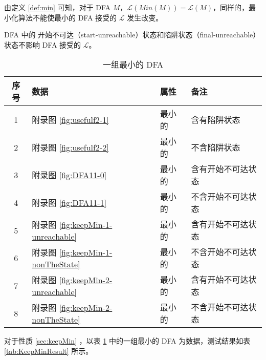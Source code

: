 \begin{property}\label{sec:keepMin}
    由定义 \ref{def:min} 可知，对于 DFA $M$，$\mathcal{L}(Min(M))= \mathcal{L}(M)$，同样的，最小化算法不能使最小的 DFA 接受的 $\mathcal{L}$ 发生改变。
\end{property}

\begin{remark}
    DFA 中的 开始不可达（start-unreachable）状态和陷阱状态（final-unreachable）状态不影响 DFA 接受的 $\mathcal{L}$。
\end{remark}



\begin{table}[!htbp]
    \caption{一组最小的 DFA}
    \label{tab:KeepMinData}
    \centering
    \small%
    \setlength{\tabcolsep}{4pt}%
    \renewcommand{\arraystretch}{1.2}%
    \begin{tabular}{c p{7em}<{\centering} p{4em}<{\centering} l}  %
        \toprule %
                序号  &  数据 & 属性 & 备注 \\
        \midrule%
        1 &  附录图 \ref{fig:usefulf2-1} & 最小的 & 含有陷阱状态 \\
        2 &  附录图 \ref{fig:usefulf2-2} & 最小的 & 不含陷阱状态 \\
        \midrule
        3 & 附录图 \ref{fig:DFA11-0} & 最小的 & 含有开始不可达状态 \\
        4 & 附录图 \ref{fig:DFA11-1} & 最小的 & 不含开始不可达状态 \\
       \midrule
        5 & 附录图 \ref{fig:keepMin-1-unreachable} & 最小的 & 含有开始不可达状态 \\
        6 & 附录图 \ref{fig:keepMin-1-nonTheState} & 最小的 & 不含开始不可达状态 \\
       \midrule
        7 & 附录图 \ref{fig:keepMin-2-unreachable} & 最小的 & 含有开始不可达状态 \\
        8 & 附录图 \ref{fig:keepMin-2-nonTheState} & 最小的 & 不含开始不可达状态 \\
        \bottomrule%
    \end{tabular}
\end{table}

\newpage
对于性质 \ref{sec:keepMin} ，以表 \ref{tab:KeepMinData} 中的一组最小的 DFA 为数据，测试结果如表 \ref{tab:KeepMinResult} 所示。

